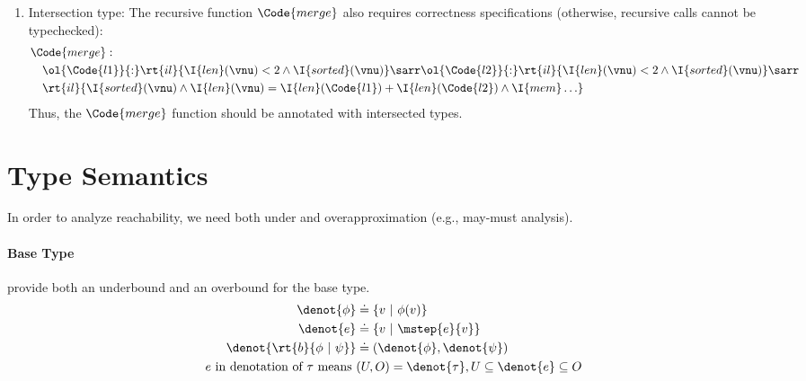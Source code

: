 \begin{enumerate}
    \begin{align*}
        &\Code{merge}:
        \\&\quad \ol{\Code{l1}}{:}\rt{il}{\I{len}(\vnu) \geq 2 \land \I{sorted}(\vnu)} \sarr \ul{\Code{l2}}{:}\rt{il}{\I{len}(\vnu) = 2 \land \I{sorted}(\vnu)} \sarr \rt{il}{\neg \I{sorted}(\vnu)}
        \\&\quad \ol{\Code{l1}}{:}\rt{il}{\I{len}(\vnu) \geq 2 \land \I{sorted}(\vnu)} \sarr \ul{\Code{l2}}{:}\unionty_{i{:}\Int}\rt{il}{\I{len}(\vnu) = i \land i \geq 2 \land \I{sorted}(\vnu)} \sarr \rt{il}{\neg \I{sorted}(\vnu)}
    \end{align*}\noindent
    This can lead to a more general specification of the $\Code{split}$ function (i.e., the incorrectness precondition):
    \begin{align*}
        &\Code{split}:
        \\&\quad \ul{l}{:}\rt{il}{\I{len}(\vnu) \geq 4} \sarr
        \\&\quad \ol{\Code{l1}}{:}\rt{il}{\I{len}(\vnu) \geq 2} \times \urt{il}{\I{len}(\vnu) = 2}
    \end{align*}\noindent
    This type can fit both implementations of the $\Code{split}$ function shown in Figure \ref{fig:split}.
    \item Intersection type: The recursive function $\Code{merge}$ also requires correctness specifications (otherwise, recursive calls cannot be typechecked):
    \begin{align*}
        &\Code{merge}:
        \\&\quad \ol{\Code{l1}}{:}\rt{il}{\I{len}(\vnu) < 2 \land \I{sorted}(\vnu)} \sarr \ol{\Code{l2}}{:}\rt{il}{\I{len}(\vnu) < 2 \land \I{sorted}(\vnu)} \sarr 
        \\&\quad \rt{il}{\I{sorted}(\vnu) \land \I{len}(\vnu) = \I{len}(\Code{l1}) + \I{len}(\Code{l2}) \land \I{mem}\ldots}
    \end{align*}\noindent
    Thus, the $\Code{merge}$ function should be annotated with intersected types.
\end{enumerate}

\section{Type Semantics}

In order to analyze reachability, we need both under and overapproximation (e.g., may-must analysis\cite{MayMust}).

\paragraph{Base Type} provide both an underbound and an overbound for the base type.
\begin{align*}
    \denot{\phi} &\doteq \{ v ~|~ \phi(v) \}
    \\ \denot{e} &\doteq \{ v ~|~ \mstep{e}{v} \}
    \\ \denot{\rt{b}{\phi ~|~ \psi}} &\doteq (\denot{\phi}, \denot{\psi})
    \\ e \text{ in denotation of $\tau$ means } &
    (U, O) = \denot{\tau}, U \subseteq \denot{e} \subseteq O
\end{align*}\noindent

